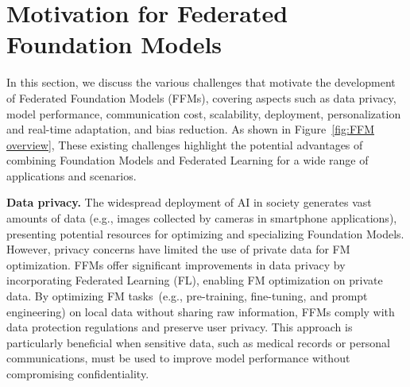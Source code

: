 \section{Motivation for Federated Foundation Models}
\label{sec:prospective}

In this section, we discuss the various challenges that motivate the development of Federated Foundation Models (FFMs), covering aspects such as data privacy, model performance, communication cost, scalability, deployment, personalization and real-time adaptation, and bias reduction. As shown in Figure~\ref{fig:FFM overview}, These existing challenges highlight the potential advantages of combining Foundation Models and Federated Learning for a wide range of applications and scenarios.


\textbf{Data privacy.}
The widespread deployment of AI in society generates vast amounts of data (e.g., images collected by cameras in smartphone applications), presenting potential resources for optimizing and specializing Foundation Models.
However, privacy concerns have limited the use of private data for FM optimization. 
FFMs offer significant improvements in data privacy by incorporating Federated Learning (FL), enabling FM optimization on private data. 
By optimizing FM tasks~(e.g., pre-training, fine-tuning, and prompt engineering) on local data without sharing raw information, FFMs comply with data protection regulations and preserve user privacy. This approach is particularly beneficial when sensitive data, such as medical records or personal communications, must be used to improve model performance without compromising confidentiality.


